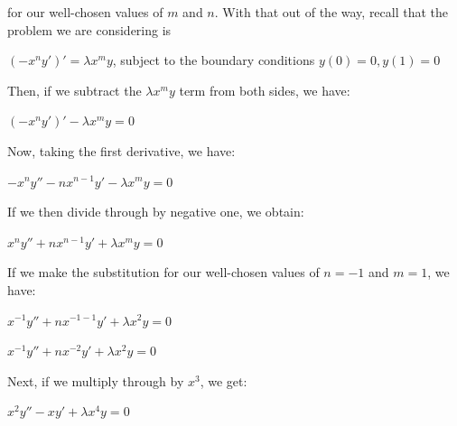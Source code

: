 \documentclass[executivepaper]{article}
\begin{document}
for our well-chosen values of $m$ and $n$. With that out of the way, recall that the problem we are considering is

\begin{center}

$(-x^ny')'=\lambda x^my$, subject to the boundary conditions $y(0)=0, y(1)=0$

\end{center}

Then, if we subtract the $\lambda x^my$ term from both sides, we have:

\begin{center}

$(-x^ny')'-\lambda x^my=0$

\end{center}

Now, taking the first derivative, we have:

\begin{center}

$-x^ny''-nx^{n-1}y'-\lambda x^my=0$

\end{center}

If we then divide through by negative one, we obtain:

\begin{center}

$x^ny''+nx^{n-1}y'+\lambda x^my=0$

\end{center}

If we make the substitution for our well-chosen values of $n=-1$ and $m=1$, we have:

\begin{center}

$x^{-1}y''+nx^{-1-1}y'+\lambda x^2y=0$

\vspace{2mm}

$x^{-1}y''+nx^{-2}y'+\lambda x^2y=0$

\end{center}

Next, if we multiply through by $x^3$, we get:

\pagebreak

\vspace*{-40mm}

\begin{center}

$x^2y''-xy'+\lambda x^4y=0$

\end{center}
\end{document}
